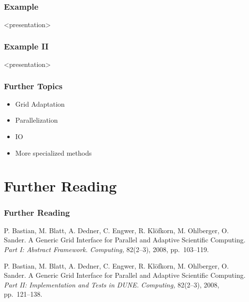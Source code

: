 \documentclass[ignorenonframetext,11pt]{beamer}
\theoremstyle{definition}
\newenvironment{codeblock}{%
  \begin{tcolorbox}[size=small,oversize,boxrule=0pt,colframe=white]}{%
  \end{tcolorbox}}
\begin{document}
\begin{frame} \frametitle{Example}
\scriptsize
\begin{codeblock}
  
\end{codeblock}
\end{frame}

\begin{onlyenv}<presentation>
\begin{frame} \frametitle{Example II}
\scriptsize
\begin{codeblock}
  
\end{codeblock}
\end{frame}
\end{onlyenv}

\begin{onlyenv}<presentation>
  \begin{frame}
    \frametitle{Further Topics}
    \begin{itemize}
    \item Grid Adaptation
    \item Parallelization
    \item IO
    \item More specialized methods
    \end{itemize}
  \end{frame}
\end{onlyenv}

\section{Further Reading}
\begin{frame} \frametitle<presentation>{Further Reading}
  \begin{thebibliography}{}

P. Bastian, M. Blatt, A. Dedner, C. Engwer, R. Klöfkorn, M. Ohlberger,
O. Sander.
\newblock A Generic Grid Interface for Parallel and Adaptive
Scientific Computing.
\emph{Part I: Abstract Framework.}
\newblock \emph{Computing,} 82(2--3), 2008, pp.~103--119.

P. Bastian, M. Blatt, A. Dedner, C. Engwer, R. Klöfkorn, M. Ohlberger,
O. Sander.
\newblock A Generic Grid Interface for Parallel and Adaptive
Scientific Computing.
\emph{Part II: Implementation and Tests in DUNE.}
\newblock \emph{Computing,} 82(2--3), 2008, pp.~121--138.

\end{thebibliography}
\end{frame}
\end{document}

